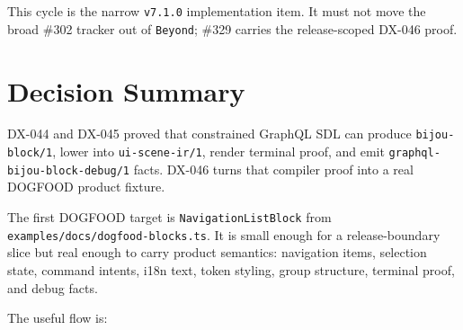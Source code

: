 This cycle is the narrow \texttt{v\allowbreak{}7\allowbreak{}.\allowbreak{}1\allowbreak{}.\allowbreak{}0} implementation item. It must not move the broad \#302 tracker out of \texttt{B\allowbreak{}e\allowbreak{}y\allowbreak{}o\allowbreak{}n\allowbreak{}d}; \#329 carries the release-scoped DX-046 proof.

\section{Decision Summary}\label{record-142-decision-summary}

DX-044 and DX-045 proved that constrained GraphQL SDL can produce \texttt{b\allowbreak{}i\allowbreak{}j\allowbreak{}o\allowbreak{}u\allowbreak{}-\allowbreak{}b\allowbreak{}l\allowbreak{}o\allowbreak{}c\allowbreak{}k\allowbreak{}/\allowbreak{}1}, lower into \texttt{u\allowbreak{}i\allowbreak{}-\allowbreak{}s\allowbreak{}c\allowbreak{}e\allowbreak{}n\allowbreak{}e\allowbreak{}-\allowbreak{}i\allowbreak{}r\allowbreak{}/\allowbreak{}1}, render terminal proof, and emit \texttt{g\allowbreak{}r\allowbreak{}a\allowbreak{}p\allowbreak{}h\allowbreak{}q\allowbreak{}l\allowbreak{}-\allowbreak{}b\allowbreak{}i\allowbreak{}j\allowbreak{}o\allowbreak{}u\allowbreak{}-\allowbreak{}b\allowbreak{}l\allowbreak{}o\allowbreak{}c\allowbreak{}k\allowbreak{}-\allowbreak{}d\allowbreak{}e\allowbreak{}b\allowbreak{}u\allowbreak{}g\allowbreak{}/\allowbreak{}1} facts. DX-046 turns that compiler proof into a real DOGFOOD product fixture.

The first DOGFOOD target is \texttt{N\allowbreak{}a\allowbreak{}v\allowbreak{}i\allowbreak{}g\allowbreak{}a\allowbreak{}t\allowbreak{}i\allowbreak{}o\allowbreak{}n\allowbreak{}L\allowbreak{}i\allowbreak{}s\allowbreak{}t\allowbreak{}B\allowbreak{}l\allowbreak{}o\allowbreak{}c\allowbreak{}k} from \texttt{e\allowbreak{}x\allowbreak{}a\allowbreak{}m\allowbreak{}p\allowbreak{}l\allowbreak{}e\allowbreak{}s\allowbreak{}/\allowbreak{}d\allowbreak{}o\allowbreak{}c\allowbreak{}s\allowbreak{}/\allowbreak{}d\allowbreak{}o\allowbreak{}g\allowbreak{}f\allowbreak{}o\allowbreak{}o\allowbreak{}d\allowbreak{}-\allowbreak{}b\allowbreak{}l\allowbreak{}o\allowbreak{}c\allowbreak{}k\allowbreak{}s\allowbreak{}.\allowbreak{}t\allowbreak{}s}. It is small enough for a release-boundary slice but real enough to carry product semantics: navigation items, selection state, command intents, i18n text, token styling, group structure, terminal proof, and debug facts.

The useful flow is:

